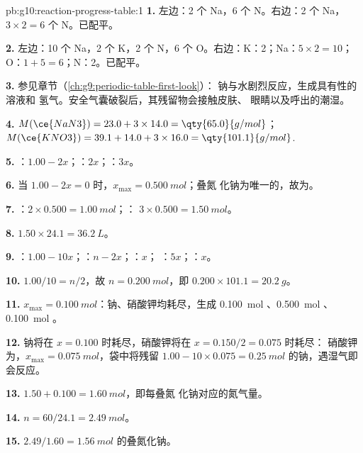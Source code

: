 \begin{solution}{pb:g10:reaction-progress-table:1}
\textbf{1.} 左边：2 个 Na，6 个 N。右边：2 个 Na，$3 \times 2 = 6$ 个 N。已配平。

\textbf{2.} 左边：10 个 Na，2 个 K，2 个 N，6 个 O。右边：K：2；Na：$5 \times 2 =
10$；O：$1 + 5 = 6$；N：2。已配平。

\textbf{3.} 参见章节（\cref{ch:g9:periodic-table-first-look}）：
钠与水剧烈反应，生成具有性的溶液和
氢气。安全气囊破裂后，其残留物会接触皮肤、
眼睛以及呼出的潮湿。

\textbf{4.} $M(\ce{NaN3}) = 23.0 + 3 \times 14.0 = \qty{65.0}{g/mol}$；
$M(\ce{KNO3}) = 39.1 + 14.0 + 3 \times 16.0 = \qty{101.1}{g/mol}$.

\textbf{5.} ：$1.00 - 2x$；：$2x$；：$3x$。

\textbf{6.} 当 $1.00 - 2x = 0$ 时，$x_{\max} = \qty{0.500}{mol}$；叠氮
化钠为唯一的，故为。

\textbf{7.} ：$2 \times 0.500 = \qty{1.00}{mol}$；：
$3 \times 0.500 = \qty{1.50}{mol}$。

\textbf{8.} $1.50 \times 24.1 = \qty{36.2}{L}$。

\textbf{9.} ：$1.00 - 10x$；：$n - 2x$；：$x$；
：$5x$；：$x$。

\textbf{10.} $1.00/10 = n/2$，故 $n = \qty{0.200}{mol}$，即
$0.200 \times 101.1 = \qty{20.2}{g}$。

\textbf{11.} $x_{\max} = \qty{0.100}{mol}$：钠、硝酸钾均耗尽，生成
\qty{0.100}{mol} 、\qty{0.500}{mol} 、
\qty{0.100}{mol} 。

\textbf{12.} 钠将在 $x = 0.100$ 时耗尽，硝酸钾将在 $x = 0.150/2 = 0.075$ 时耗尽：
硝酸钾为，$x_{\max} =
\qty{0.075}{mol}$，袋中将残留 $1.00 - 10 \times 0.075 = \qty{0.25}{mol}$
的钠，遇湿气即会反应。

\textbf{13.} $1.50 + 0.100 = \qty{1.60}{mol}$，即每叠氮
化钠对应的氮气量。

\textbf{14.} $n = 60 / 24.1 = \qty{2.49}{mol}$。

\textbf{15.} $2.49 / 1.60 = \qty{1.56}{mol}$ 的叠氮化钠。


\end{solution}
